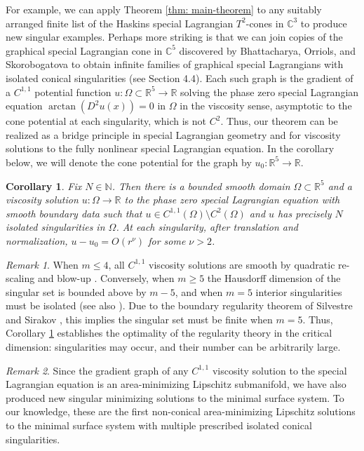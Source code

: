 \documentclass[11pt]{amsart}
\newtheorem{corollary}{Corollary}
\theoremstyle{definition}
\theoremstyle{remark}
\newtheorem{remark}{Remark}
\begin{document}
For example, we can apply Theorem \ref{thm: main-theorem} to any suitably arranged finite list of the Haskins special Lagrangian $T^2$-cones in $\mathbb{C}^3$ \cite{Haskins-SLag-cones, Ha04} to produce new singular examples. Perhaps more striking is that we can join copies of the graphical special Lagrangian cone in $\mathbb{C}^5$ discovered by Bhattacharya, Orriols, and Skorobogatova \cite[Theorem 1.4]{BOS26} to obtain infinite families of graphical special Lagrangians with isolated conical singularities (see Section 4.4). Each such graph is the gradient of a $C^{1,1}$ potential function $u : \Omega \subset \mathbb{R}^5 \rightarrow \mathbb{R}$ solving the phase zero special Lagrangian equation $\arctan(D^2u(x)) = 0$ in $\Omega$ in the viscosity sense, asymptotic to the cone potential at each singularity, which is not $C^2$. Thus, our theorem can be realized as a bridge principle in special Lagrangian geometry and for viscosity solutions to the fully nonlinear special Lagrangian equation. In the corollary below, we will denote the cone potential for the graph by $u_0: \mathbb{R}^5 \rightarrow \mathbb{R}$.
\begin{corollary}\label{cor: SLEsolution}
    Fix $N \in \mathbb{N}$. Then there is a bounded smooth domain $\Omega \subset \mathbb{R}^5$ and a viscosity solution $u: \Omega \rightarrow \mathbb{R}$ to the phase zero special Lagrangian equation with smooth boundary data such that $u \in C^{1,1}(\Omega) \setminus C^2(\Omega)$ and $u$ has precisely $N$ isolated singularities in $\Omega$. At each singularity, after translation and normalization, $u - u_0 = O(r^\nu)$ for some $\nu > 2$.
\end{corollary}
\begin{remark}
    When $m \leq 4$, all $C^{1,1}$ viscosity solutions are smooth by quadratic re-scaling and blow-up \cite{NV13}. Conversely, when $m \geq 5$ the Hausdorff dimension of the singular set is bounded above by $m - 5$, and when $m = 5$ interior singularities must be isolated \cite[Theorem 1.1]{BOS26} (see also \cite[Theorem 3.9]{Dim23}). Due to the boundary regularity theorem of Silvestre and Sirakov \cite[Theorem 1.3]{SS14}, this implies the singular set must be finite when $m = 5$. Thus, Corollary \ref{cor: SLEsolution} establishes the optimality of the regularity theory in the critical dimension: singularities may occur, and their number can be arbitrarily large.
\end{remark}
\begin{remark}
    Since the gradient graph of any $C^{1,1}$ viscosity solution to the special Lagrangian equation is an area-minimizing Lipschitz submanifold, we have also produced new singular minimizing solutions to the minimal surface system. To our knowledge, these are the first non-conical area-minimizing Lipschitz solutions to the minimal surface system with multiple prescribed isolated conical singularities.
\end{remark}
\end{document}
